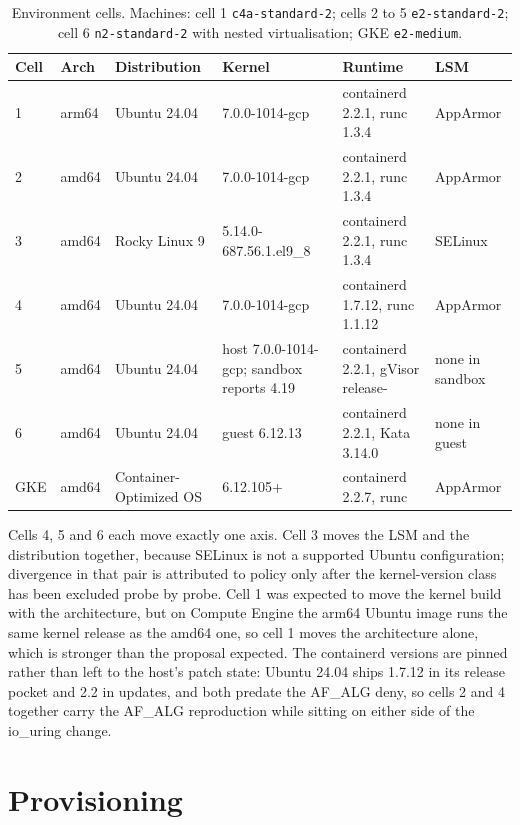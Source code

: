 \begin{table}[htbp]
\centering\footnotesize
\begin{tabularx}{\textwidth}{@{}lP{1.0cm}P{2.3cm}P{3.0cm}LP{1.6cm}@{}}
\toprule
\textbf{Cell} & \textbf{Arch} & \textbf{Distribution} & \textbf{Kernel} & \textbf{Runtime} & \textbf{LSM} \\
 & arm64 & Ubuntu 24.04 & 7.0.0-1014-gcp & containerd 2.2.1, runc 1.3.4 & AppArmor \\
2 & amd64 & Ubuntu 24.04 & 7.0.0-1014-gcp & containerd 2.2.1, runc 1.3.4 & AppArmor \\
3 & amd64 & Rocky Linux 9 & 5.14.0-687.56.1.el9\_8 & containerd 2.2.1, runc 1.3.4 & SELinux \\
4 & amd64 & Ubuntu 24.04 & 7.0.0-1014-gcp & containerd 1.7.12, runc 1.1.12 & AppArmor \\
5 & amd64 & Ubuntu 24.04 & host 7.0.0-1014-gcp; sandbox reports 4.19 & containerd 2.2.1, gVisor release- & none in sandbox \\
6 & amd64 & Ubuntu 24.04 & guest 6.12.13 & containerd 2.2.1, Kata 3.14.0 & none in guest \\
GKE & amd64 & Container-Opti\-mized OS & 6.12.105+ & containerd 2.2.7, runc & AppArmor \\
\bottomrule
\end{tabularx}
\caption{Environment cells. Machines: cell 1 \texttt{c4a-standard-2}; cells 2 to 5 \texttt{e2-standard-2}; cell 6 \texttt{n2-standard-2} with nested virtualisation; GKE \texttt{e2-medium}.}
\label{tab:cells}
\end{table}

Cells 4, 5 and 6 each move exactly one axis. Cell 3 moves the LSM and the distribution together, because SELinux is not a supported Ubuntu configuration; divergence in that pair is attributed to policy only after the kernel-version class has been excluded probe by probe. Cell 1 was expected to move the kernel build with the architecture, but on Compute Engine the arm64 Ubuntu image runs the same kernel release as the amd64 one, so cell 1 moves the architecture alone, which is stronger than the proposal expected. The containerd versions are pinned rather than left to the host's patch state: Ubuntu 24.04 ships 1.7.12 in its release pocket and 2.2 in updates, and both predate the AF\_ALG deny, so cells 2 and 4 together carry the AF\_ALG reproduction while sitting on either side of the io\_uring change.

\section{Provisioning}

